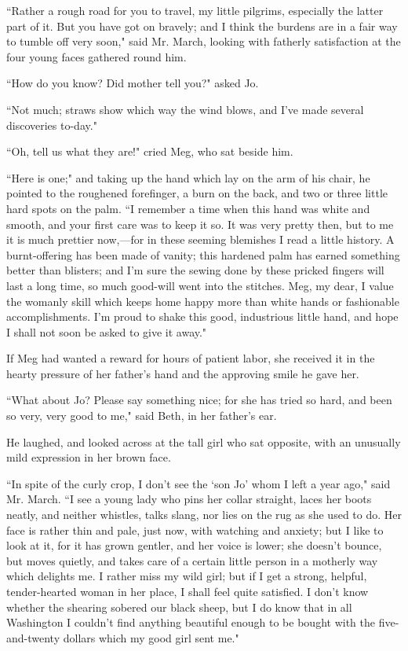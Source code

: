``Rather a rough road for you to travel, my little pilgrims, especially
the latter part of it. But you have got on bravely; and I think the
burdens are in a fair way to tumble off very soon," said Mr. March,
looking with fatherly satisfaction at the four young faces gathered
round him.

``How do you know? Did mother tell you?" asked Jo.

``Not much; straws show which way the wind blows, and
I've made several discoveries to-day."

``Oh, tell us what they are!" cried Meg, who sat beside him.

``Here is one;" and taking up the hand which lay on the arm of his chair,
he pointed to the roughened forefinger, a burn on the back, and two or
three little hard spots on the palm. ``I remember a time when this hand
was white and smooth, and your first care was to keep it so. It was very
pretty then, but to me it is much prettier now,---for in these seeming
blemishes I read a little history. A burnt-offering has been made of
vanity; this hardened palm has earned something better than blisters;
and I'm sure the sewing done by these pricked fingers
will last a long time, so much good-will went into the stitches. Meg, my
dear, I value the womanly skill which keeps home happy more than white
hands or fashionable accomplishments. I'm proud to shake
this good, industrious little hand, and hope I shall not soon be asked
to give it away."

If Meg had wanted a reward for hours of patient labor, she received it
in the hearty pressure of her father's hand and the
approving smile he gave her.

``What about Jo? Please say something nice; for she has tried so hard,
and been so very, very good to me," said Beth, in her
father's ear.

He laughed, and looked across at the tall girl who sat opposite, with an
unusually mild expression in her brown face.

``In spite of the curly crop, I don't see the
`son Jo' whom I left a year ago," said
Mr. March. ``I see a young lady who pins her collar straight, laces her
boots neatly, and neither whistles, talks slang, nor lies on the rug as
she used to do. Her face is rather thin and pale, just now, with
watching and anxiety; but I like to look at it, for it has grown
gentler, and her voice is lower; she doesn't bounce, but
moves quietly, and takes care of a certain little person in a motherly
way which delights me. I rather miss my wild girl; but if I get a
strong, helpful, tender-hearted woman in her place, I shall feel quite
satisfied. I don't know whether the shearing sobered our
black sheep, but I do know that in all Washington I
couldn't find anything beautiful enough to be bought
with the five-and-twenty dollars which my good girl sent me."

